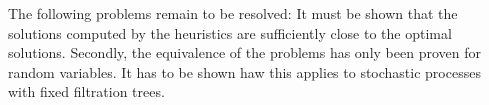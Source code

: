 The following problems remain to be resolved: It must be shown that the solutions computed by the heuristics are sufficiently close to the optimal solutions.
Secondly, the equivalence of the problems has only been proven for random variables.
It has to be shown haw this applies to stochastic processes with fixed filtration trees.
\begin{comment}
In this section, we analyze the computation of the Kantorovich distance for a different setup.
Consider again two discrete stochastic processes $I$ and $J$ over time stages $T$ with values $\xi_i^t,\,i\in I$ and $\nu_j,\, j\in J,\;t\in T$.
Here, the values $\xi_i^t$ and their probabilities $p_i$ for process $I$ are fixed, while the values $\nu_j^t$ and probabilities $q_j$ for process $J$ are to be selected such that the Kantorovich Distance $D_K(I,J)$ is minimal.
The problem can be expressed as the NLP
\begin{align}
  \min\limits_{\eta,q,\nu}&\sum_{i\in I}\sum_{j\in J}\eta_{ij}c(\xi_i,\nu_j)\\
  \text{s.t.}&\sum_{i\in I}\eta_{ij} = q_j\\
  &\sum_{j\in J}\eta_{ij} = p_i\\
  &\eta_{ij}\geq 0\\
  &q\geq 0
\end{align}
As shown above in theorem \ref{thm:optimal-weights}, for any given set of $\nu_j^t$ the variables $\eta_{ij}$ and $q$ will take on the values
\begin{align}
  \eta_{ij} &= \left\{\begin{array}{lr}p_i&\text{if }j=\underset{j\in J}{\operatorname{argmin}}\, c(\xi_i,\nu_j)\\0&\text{otherwise}\end{array}\right. ,\\
  q_j &= \sum_{i\in I_j}p_i\text{ with } I_j= \left\{i\in I|j=\underset{k\in J}{\operatorname{argmin}}\, c(\xi_i,\nu_j)\right\}.
\end{align}
This corresponds to a \textit{set partitioning} of the set $I$ into $|J|$ parts, defined by a mapping
\[P:I\rightarrow J,\; i\mapsto \underset{j\in J}{\operatorname{argmin}}\, c(\xi_i, \nu_j)\]
Given the distances $c(\xi_i,\nu_j)$, the optimal partitioning of $I$ can be computed using theorem \ref{thm:optimal-weights} and algorithm \ref{alg:optimal-weights}.


\end{comment}
